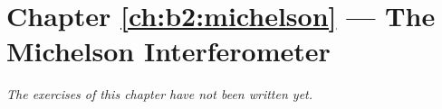 \section*{Chapter \ref{ch:b2:michelson} --- The Michelson Interferometer}


\emph{The exercises of this chapter have not been written yet.}
